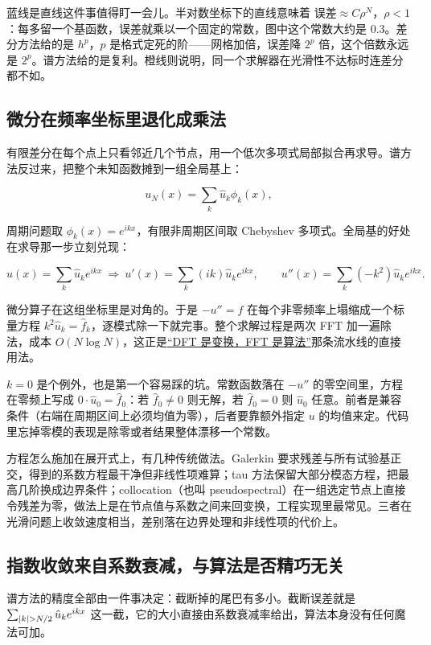 蓝线是直线这件事值得盯一会儿。半对数坐标下的直线意味着 \(\text{误差}\approx C\rho^{N}\)，\(\rho<1\)：每多留一个基函数，误差就乘以一个固定的常数，图中这个常数大约是 \(0.3\)。差分方法给的是 \(h^{p}\)，\(p\) 是格式定死的阶——网格加倍，误差降 \(2^{p}\) 倍，这个倍数永远是 \(2^{p}\)。谱方法给的是复利。橙线则说明，同一个求解器在光滑性不达标时连差分都不如。

\subsection{微分在频率坐标里退化成乘法}

有限差分在每个点上只看邻近几个节点，用一个低次多项式局部拟合再求导。谱方法反过来，把整个未知函数摊到一组全局基上：

\[
u_N(x)=\sum_{k}\hat u_k\phi_k(x),
\]

周期问题取 \(\phi_k(x)=e^{ikx}\)，有限非周期区间取 Chebyshev 多项式。全局基的好处在求导那一步立刻兑现：

\[
u(x)=\sum_k\hat u_ke^{ikx}\ \Longrightarrow\ u'(x)=\sum_k(ik)\hat u_ke^{ikx},\qquad u''(x)=\sum_k(-k^2)\hat u_ke^{ikx}.
\]

微分算子在这组坐标里是对角的。于是 \(-u''=f\) 在每个非零频率上塌缩成一个标量方程 \(k^2\hat u_k=\hat f_k\)，逐模式除一下就完事。整个求解过程是两次 FFT 加一遍除法，成本 \(O(N\log N)\)，这正是\hyperref[sec:08-Numerical-Analysis/08-Fourier-and-Spectral-Methods/03]{``DFT 是变换，FFT 是算法''}那条流水线的直接用法。

\(k=0\) 是个例外，也是第一个容易踩的坑。常数函数落在 \(-u''\) 的零空间里，方程在零频上写成 \(0\cdot\hat u_0=\hat f_0\)：若 \(\hat f_0\ne0\) 则无解，若 \(\hat f_0=0\) 则 \(\hat u_0\) 任意。前者是兼容条件（右端在周期区间上必须均值为零），后者要靠额外指定 \(u\) 的均值来定。代码里忘掉零模的表现是除零或者结果整体漂移一个常数。

方程怎么施加在展开式上，有几种传统做法。Galerkin 要求残差与所有试验基正交，得到的系数方程最干净但非线性项难算；tau 方法保留大部分模态方程，把最高几阶换成边界条件；collocation（也叫 pseudospectral）在一组选定节点上直接令残差为零，做法上是在节点值与系数之间来回变换，工程实现里最常见。三者在光滑问题上收敛速度相当，差别落在边界处理和非线性项的代价上。

\subsection{指数收敛来自系数衰减，与算法是否精巧无关}

谱方法的精度全部由一件事决定：截断掉的尾巴有多小。截断误差就是 \(\sum_{\abs{k}>N/2}\hat u_ke^{ikx}\) 这一截，它的大小直接由系数衰减率给出，算法本身没有任何魔法可加。

